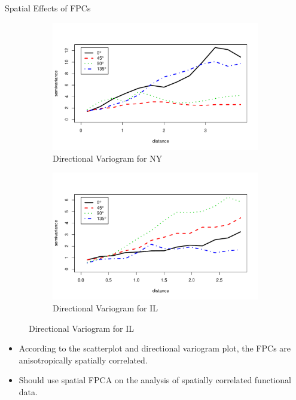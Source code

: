 \documentclass[final]{beamer}
\newlength{\colwidth}
\begin{document}
\begin{frame}[t]
\begin{columns}[t]
\begin{column}{\colwidth}
\begin{block}{Spatial Effects of FPCs}
\begin{figure}[h]
\begin{subfigure}{0.5\textwidth}
    \includegraphics[width=1.05\linewidth]{figure/vario_NY.pdf}
    \caption{Directional Variogram for NY}
  \end{subfigure}%
      \begin{subfigure}{0.5\textwidth}
    \centering
    \includegraphics[width=1.05\linewidth]{figure/vario_IL.pdf}
    \caption{Directional Variogram for IL}
  \end{subfigure}%
\end{figure}

  \end{block}


\begin{itemize}
\item According to the scatterplot and directional variogram plot, the FPCs are anisotropically spatially correlated.
\item Should use spatial FPCA on the analysis of spatially correlated functional data.
\end{itemize}



\end{column}
\end{columns}
\end{frame}
\end{document}
